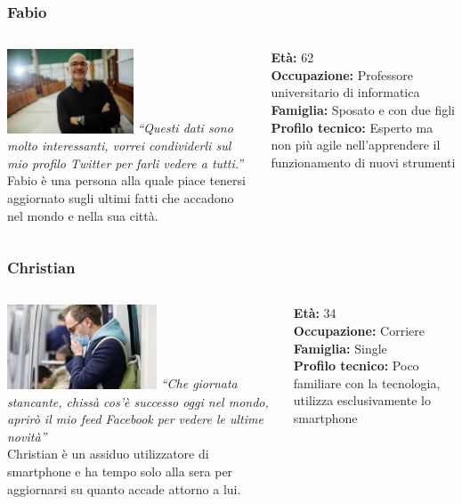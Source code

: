 \documentclass[handout]{beamer}
\begin{document}
		\begin{frame}
			\frametitle{Fabio}
			\begin{columns}[t]
				\begin{column}[T]{6cm}
					\includegraphics[height=2.5cm]{img/fabio}
					\textit{``Questi dati sono molto interessanti, vorrei condividerli sul mio profilo Twitter per farli vedere a tutti.''}\\
					Fabio è una persona alla quale piace tenersi aggiornato sugli ultimi fatti che accadono nel mondo e nella sua città.
				\end{column}
				\begin{column}[T]{5cm}
					\textbf{Età:} 62\\
					\textbf{Occupazione:} Professore universitario di informatica\\
					\textbf{Famiglia:} Sposato e con due figli\\
					\textbf{Profilo tecnico:} Esperto ma non più agile nell'apprendere il funzionamento di nuovi strumenti\\
				\end{column}
			\end{columns}
		\end{frame}

		\begin{frame}
			\frametitle{Christian}
			\begin{columns}[t]
				\begin{column}[T]{6cm}
					\includegraphics[height=2.5cm]{img/christian}
					\textit{``Che giornata stancante, chissà cos'è successo oggi nel mondo, aprirò il mio feed Facebook per vedere le ultime novità''}\\
					Christian è un assiduo utilizzatore di smartphone e  ha tempo solo alla sera per aggiornarsi su quanto accade attorno a lui.
				\end{column}
				\begin{column}[T]{5cm}
					\textbf{Età:} 34\\
					\textbf{Occupazione:} Corriere\\
					\textbf{Famiglia:} Single\\
					\textbf{Profilo tecnico:} Poco familiare con la tecnologia, utilizza esclusivamente lo smartphone\\
				\end{column}
			\end{columns}
		\end{frame}
		
\end{document}
